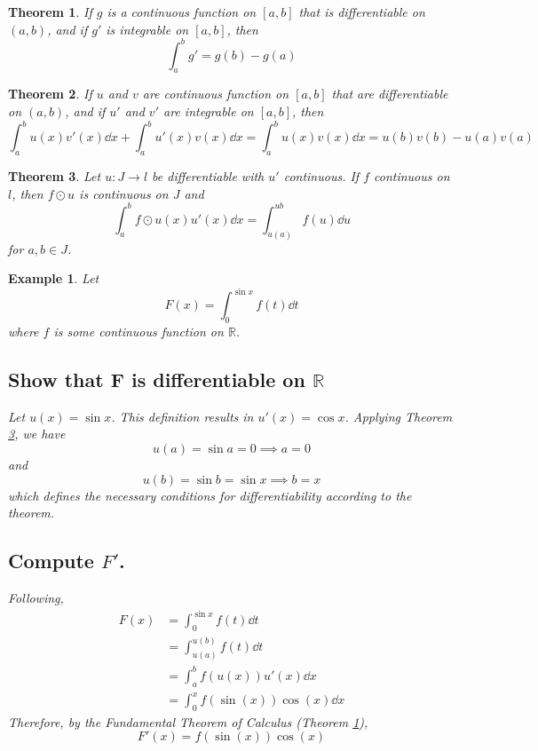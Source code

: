 \documentclass[]{article}
\newcommand{\R}{\mathbb{R}}
\newtheorem{theorem}{Theorem}
\newtheorem{example}{Example}
\begin{document}
\begin{theorem}\label{thm:FTC}
    If $g$ is a continuous function on $[a,b]$ that is differentiable on $(a,b)$, and if $g'$ is integrable on $[a,b]$, then \[
        \int_{a}^{b} g' = g(b) - g(a)
    \]
\end{theorem}

\begin{theorem}\label{thm:int_by_parts}
    If $u$ and $v$ are continuous function on $[a,b]$ that are differentiable on $(a,b)$, and if $u'$ and $v'$ are integrable on $[a,b]$, then \[
        \int_{a}^{b} u(x) v'(x) \dd{x} + \int_{a}^{b} u'(x) v(x) \dd{x} = \int_{a}^{b} u(x) v(x) \dd{x} = u(b)v(b) - u(a) v(a)
    \]
\end{theorem}

\begin{theorem}\label{thm:int_u_sub}
    Let $u : J \to l$ be differentiable with $u'$ continuous.
    If $f$ continuous on $l$, then $f \odot u$ is continuous on $J$ and \[
        \int_{a}^{b} f \odot u(x) u'(x) \dd{x} = \int_{u(a)}^{u{b}} f(u) \dd{u}
    \] for $a,b \in J$.
\end{theorem}


\begin{example}
    Let\[
        F(x) = \int_{0}^{\sin{x}} f(t) \dd{t}
    \] where $f$ is some continuous function on $\R$.

    \subsection{Show that F is differentiable on $\R$}
    Let $u(x) = \sin{x}$. 
    This definition results in $u'(x) = \cos{x}$. 
    Applying Theorem \ref{thm:int_u_sub}, we have \[
        u(a) = \sin{a} = 0 \implies a = 0
    \] and \[
        u(b) = \sin{b} = \sin{x} \implies b = x
    \] which defines the necessary conditions for differentiability according to the theorem.
    \subsection{Compute $F'$.}
    Following,
    \begin{align*}
        F(x) &= \int_{0}^{\sin{x}} f(t) \dd{t}\\
            &= \int_{u(a)}^{u(b)} f(t) \dd{t}\\
            &= \int_{a}^{b} f(u(x)) u'(x) \dd{x}\\
            &= \int_{0}^{x} f(\sin(x)) \cos(x) \dd{x}
    \end{align*}
    Therefore, by the Fundamental Theorem of Calculus (Theorem \ref{thm:FTC}), \[
        \boxed{F'(x) = f(\sin(x)) \cos(x)}
    \]
\end{example}
\end{document}
